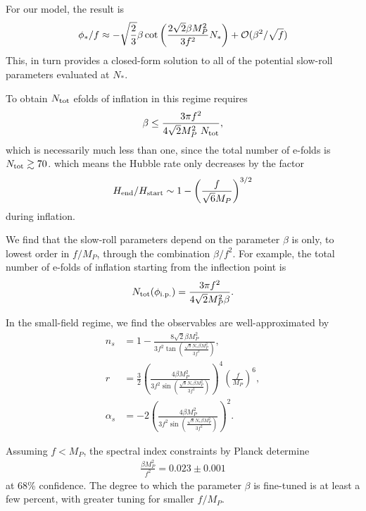 \documentclass[aps,amsfonts,amsmath,prd,preprint,nofootinbib,superscriptaddress]{revtex4}
\newcommand{\Mp}{{M_{P}}}
\newcommand{\MMp}{{M_P^2}}
\begin{document}
For our model, the result is
\begin{align}
\phi_\ast/f \approx -\sqrt{\frac{2}{3}}\beta \cot\left(\frac{2\sqrt{2}\beta\MMp}{3f^2}N_\ast\right) + {\cal O}(\beta^2/\sqrt{f})
\end{align}  
This, in turn provides a closed-form solution to all of the potential slow-roll parameters
evaluated at $N_\ast$.





To obtain $N_{\rm tot}$ efolds of inflation in this regime requires
\begin{align}
 \beta \leq \frac{3\pi f^2}{4\sqrt{2}\MMp~N_{\rm tot}}, 
 \end{align}
which is necessarily much less than one, since the total number of e-folds is $N_{\rm tot} \gtrsim 70$. 
which means the Hubble rate only decreases by the factor
\begin{align}
H_{\rm end}/H_{\rm start} \sim 1-\left(\frac{f}{\sqrt{6}\Mp}\right)^{3/2}
\end{align}
during inflation.  







We find that the slow-roll parameters depend
on the parameter $\beta$ is only, to lowest order in $f/\Mp$, through the combination $\beta/f^2$.  For example, the total number of e-folds of inflation starting from the inflection point is
\begin{align}
N_{\rm tot}(\phi_{\rm i.p.}) = \frac{3 \pi f^2}{4\sqrt{2}\MMp\beta}.
\end{align}

In the small-field regime, we find the observables are well-approximated by
\begin{align}
n_s &= 1- \frac{8\sqrt{2}\beta \MMp}{3f^2\tan(\frac{\sqrt{8}N_\ast\beta\MMp}{3 f^2})},\label{eq:nsSF}\\
r &= \frac{3}{2}\left(\frac{4\beta\MMp}{3f^2\sin(\frac{\sqrt{8}N_\ast\beta\MMp}{3 f^2})}\right)^4 \left(\frac{f}{\Mp}\right)^6 ,\\
\alpha_s &= -2\left(\frac{4\beta \MMp}{3f^2\sin(\frac{\sqrt{8}N_\ast\beta\MMp}{3 f^2})} \right)^2.
\end{align}

Assuming $f < \Mp$, the spectral index constraints by Planck \cite{Akrami:2018odb} determine
\begin{align}
\frac{\beta \MMp}{f^2} = 0.023 \pm 0.001
\end{align}
 at 68\% confidence.  The degree to which the parameter $\beta$ is fine-tuned is at least a few percent, with greater tuning for smaller $f/\Mp$.
\end{document}
